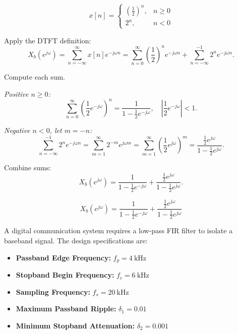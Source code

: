 \begin{solutionblock}

\[
x[n] =
\begin{cases}
\left(\frac{1}{2}\right)^n, & n \ge 0 \\
2^n, & n < 0
\end{cases}
\]

Apply the DTFT definition:
\[
X_b(e^{j\omega}) = \sum_{n=-\infty}^{\infty} x[n] e^{-j \omega n} 
= \sum_{n=0}^{\infty} \left(\frac{1}{2}\right)^n e^{-j \omega n} + \sum_{n=-\infty}^{-1} 2^n e^{-j \omega n}.
\]

Compute each sum.

\textit{Positive $n \ge 0$:}
\[
\sum_{n=0}^{\infty} \left(\frac{1}{2} e^{-j\omega}\right)^n = \frac{1}{1 - \frac{1}{2} e^{-j\omega}}, \quad \left| \frac{1}{2} e^{-j\omega} \right| < 1.
\]

\textit{Negative $n < 0$, let $m = -n$:}
\[
\sum_{n=-\infty}^{-1} 2^n e^{-j \omega n} = \sum_{m=1}^{\infty} 2^{-m} e^{j\omega m} = \sum_{m=1}^{\infty} \left(\frac{1}{2} e^{j\omega}\right)^m = \frac{\frac{1}{2} e^{j\omega}}{1 - \frac{1}{2} e^{j\omega}}.
\]

Combine sums:
\[
X_b(e^{j\omega}) = \frac{1}{1 - \frac{1}{2} e^{-j\omega}} + \frac{\frac{1}{2} e^{j\omega}}{1 - \frac{1}{2} e^{j\omega}}.
\]

\[
\boxed{X_b(e^{j\omega}) = \frac{1}{1 - \frac{1}{2} e^{-j\omega}} + \frac{\frac{1}{2} e^{j\omega}}{1 - \frac{1}{2} e^{j\omega}}}
\]
\end{solutionblock}



A digital communication system requires a low-pass FIR filter to isolate a baseband signal. The design specifications are:

\begin{itemize}
    \item \textbf{Passband Edge Frequency:} $f_p = 4~\text{kHz}$
    \item \textbf{Stopband Begin Frequency:} $f_c = 6~\text{kHz}$
    \item \textbf{Sampling Frequency:} $f_s = 20~\text{kHz}$
    \item \textbf{Maximum Passband Ripple:} $\delta_1 = 0.01$
    \item \textbf{Minimum Stopband Attenuation:} $\delta_2 = 0.001$
\end{itemize}

